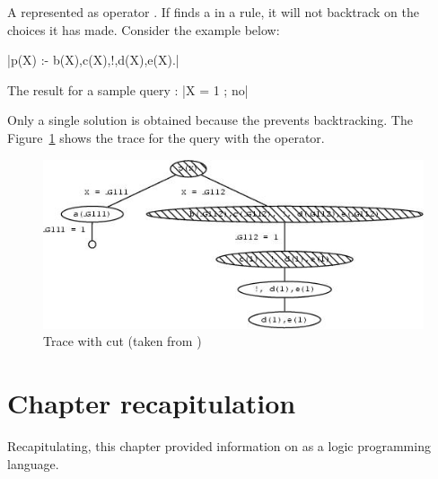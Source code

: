 \documentclass[thesis-solanki.tex]{subfiles}
\begin{document}
A  represented as \prologConstruct{!}
operator \cite{website:prologcut}.
If  finds a  in a rule, it will not backtrack on the choices it has made.
Consider the example below:

|p(X) :- b(X),c(X),!,d(X),e(X).|

The result for a sample query :
|X = 1 ; no|

Only a single solution is obtained because the  prevents backtracking. The Figure~\ref{fig:Trace with cut} shows the 
trace for the query with the  operator.

\begin{figure}[H]
\centering
\includegraphics[scale = .95]{prologcutrace.jpeg}
\caption{Trace with cut (taken from \cite{website:cutprologunionedu})}
\label{fig:Trace with cut}
\end{figure}

\section{Chapter recapitulation}
Recapitulating, this chapter provided information on  as a logic programming language.

\ifMain\ifDraft
\begin{scope}
  \nolinenumbers
  \enotesize
  \par
  \begin{singlespace}
  \setlength{\parskip}{12pt plus 2pt minus 1pt}
  \theendnotes
  \par
  \end{singlespace}
\end{scope}
\fi\fi
\end{document}
